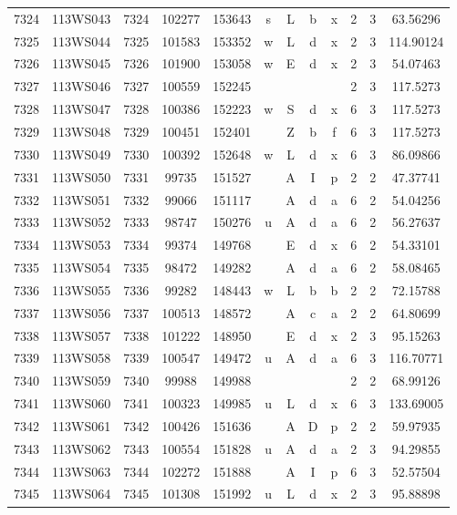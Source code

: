 \begin{tabular}{|*{12}{c|}}
7324 & 113WS043 & 7324 & 102277 & 153643 & s & L & b & x & 2 & 3 & 63.56296 \\ 
7325 & 113WS044 & 7325 & 101583 & 153352 & w & L & d & x & 2 & 3 & 114.90124 \\ 
7326 & 113WS045 & 7326 & 101900 & 153058 & w & E & d & x & 2 & 3 & 54.07463 \\ 
7327 & 113WS046 & 7327 & 100559 & 152245 &  &  &  &  & 2 & 3 & 117.5273 \\ 
7328 & 113WS047 & 7328 & 100386 & 152223 & w & S & d & x & 6 & 3 & 117.5273 \\ 
7329 & 113WS048 & 7329 & 100451 & 152401 &  & Z & b & f & 6 & 3 & 117.5273 \\ 
7330 & 113WS049 & 7330 & 100392 & 152648 & w & L & d & x & 6 & 3 & 86.09866 \\ 
7331 & 113WS050 & 7331 & 99735 & 151527 &  & A & I & p & 2 & 2 & 47.37741 \\ 
7332 & 113WS051 & 7332 & 99066 & 151117 &  & A & d & a & 6 & 2 & 54.04256 \\ 
7333 & 113WS052 & 7333 & 98747 & 150276 & u & A & d & a & 6 & 2 & 56.27637 \\ 
7334 & 113WS053 & 7334 & 99374 & 149768 &  & E & d & x & 6 & 2 & 54.33101 \\ 
7335 & 113WS054 & 7335 & 98472 & 149282 &  & A & d & a & 6 & 2 & 58.08465 \\ 
7336 & 113WS055 & 7336 & 99282 & 148443 & w & L & b & b & 2 & 2 & 72.15788 \\ 
7337 & 113WS056 & 7337 & 100513 & 148572 &  & A & c & a & 2 & 2 & 64.80699 \\ 
7338 & 113WS057 & 7338 & 101222 & 148950 &  & E & d & x & 2 & 3 & 95.15263 \\ 
7339 & 113WS058 & 7339 & 100547 & 149472 & u & A & d & a & 6 & 3 & 116.70771 \\ 
7340 & 113WS059 & 7340 & 99988 & 149988 &  &  &  &  & 2 & 2 & 68.99126 \\ 
7341 & 113WS060 & 7341 & 100323 & 149985 & u & L & d & x & 6 & 3 & 133.69005 \\ 
7342 & 113WS061 & 7342 & 100426 & 151636 &  & A & D & p & 2 & 2 & 59.97935 \\ 
7343 & 113WS062 & 7343 & 100554 & 151828 & u & A & d & a & 2 & 3 & 94.29855 \\ 
7344 & 113WS063 & 7344 & 102272 & 151888 &  & A & I & p & 6 & 3 & 52.57504 \\ 
7345 & 113WS064 & 7345 & 101308 & 151992 & u & L & d & x & 2 & 3 & 95.88898 \\ 

\end{tabular}

